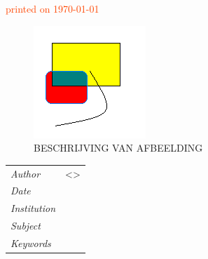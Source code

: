 {}

\thispagestyle{empty} %

\addvspace{40mm}

\begin{center}
\textcolor{OrangeRed}{printed on \today}\\
\bigskip
\huge{\metatitle}
\end{center}

\begin{figure}[H]
	\centering
	\includegraphics[scale=1.0]{_example/AFBEELDING.png}
	\caption{BESCHRIJVING VAN AFBEELDING}
	\label{fig:AFBEELDING}
\end{figure}

\addvspace{40mm}

\begin{abstract}
\noindent{\metaabstract}
\end{abstract}

\addvspace{40mm}

\begin{tabular}{l l}
\textit{Author}			&	\metaauthor \space <\metacontact> \\
\textit{Date}			&	\metadate \\
\textit{Institution}	&	\metaorganisation \\
\textit{Subject}		&	\metasubject \\
\textit{Keywords}		&	\metakeywords \\
\end{tabular}

\clearpage
